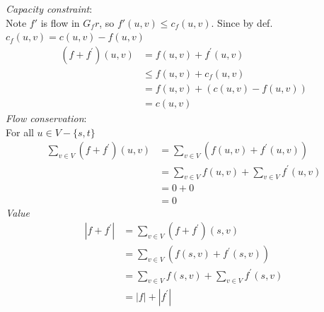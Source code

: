 \documentclass{article}[18pt]
\begin{document}
\textit{Capacity constraint}:\\
Note $f'$ is flow in $G_fr$, so $f'(u,v)\leqslant  c_f(u,v)$. Since by def. $c_f(u,v) = c(u,v)-f(u,v)$
\[
\begin{aligned}
\left(f+f^{\prime}\right)(u, v) &=f(u, v)+f^{\prime}(u, v) \\
& \leq f(u, v)+c_{f}(u, v) \\
&=f(u, v)+(c(u, v)-f(u, v)) \\
&=c(u, v)
\end{aligned}
\]
\textit{Flow conservation}:\\
For all $u\in V-\{s,t\}$
\[
\begin{aligned}
\sum_{v \in V}\left(f+f^{\prime}\right)(u, v) &=\sum_{v \in V}\left(f(u, v)+f^{\prime}(u, v)\right) \\
&=\sum_{v \in V} f(u, v)+\sum_{v \in V} f^{\prime}(u, v) \\
&=0+0 \\
&=0
\end{aligned}
\]
\textit{Value}
\[
\begin{aligned}
\left|f+f^{\prime}\right| &=\sum_{v \in V}\left(f+f^{\prime}\right)(s, v) \\
&=\sum_{v \in V}\left(f(s, v)+f^{\prime}(s, v)\right) \\
&=\sum_{v \in V} f(s, v)+\sum_{v \in V} f^{\prime}(s, v) \\
&=|f|+\left|f^{\prime}\right|
\end{aligned}
\]
\end{document}

